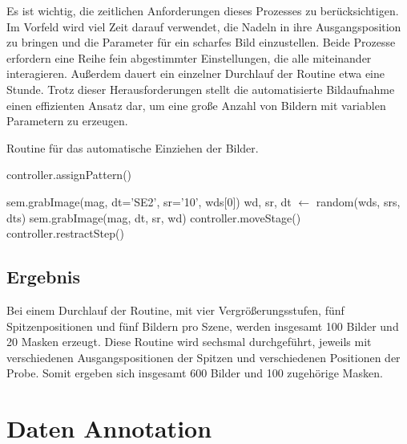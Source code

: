 Es ist wichtig, die zeitlichen Anforderungen dieses Prozesses zu berücksichtigen. Im Vorfeld wird viel Zeit darauf verwendet, die Nadeln in ihre Ausgangsposition zu bringen und die Parameter für ein scharfes Bild einzustellen. Beide Prozesse erfordern eine Reihe fein abgestimmter Einstellungen, die alle miteinander interagieren. Außerdem dauert ein einzelner Durchlauf der Routine etwa eine Stunde. Trotz dieser Herausforderungen stellt die automatisierte Bildaufnahme einen effizienten Ansatz dar, um eine große Anzahl von Bildern mit variablen Parametern zu erzeugen.

\begin{algorithm}[h!]
\begin{algorithmic}[1]
\caption{Routine für das automatische Einziehen der Bilder.}
\label{alg:Pseudocode}
  \STATE controller.assignPattern()
  
    \STATE sem.grabImage(mag, dt='SE2', sr='10', wds[0])
        \STATE wd, sr, dt $\leftarrow$ random(wds, srs, dts)
        \STATE sem.grabImage(mag, dt, sr, wd)
        \STATE controller.moveStage()
    \ENDFOR
    \STATE controller.restractStep()
  \ENDFOR
\ENDFOR
\end{algorithmic}
\end{algorithm}
\subsection{Ergebnis}
Bei einem Durchlauf der Routine, mit vier Vergrößerungsstufen, fünf Spitzenpositionen
und fünf Bildern pro Szene, werden insgesamt 100 Bilder und 20 Masken
erzeugt. Diese Routine wird sechsmal durchgeführt, jeweils mit verschiedenen
Ausgangspositionen der Spitzen und verschiedenen Positionen der Probe. Somit
ergeben sich insgesamt 600 Bilder und 100 zugehörige Masken.
\clearpage
\section{Daten Annotation}

